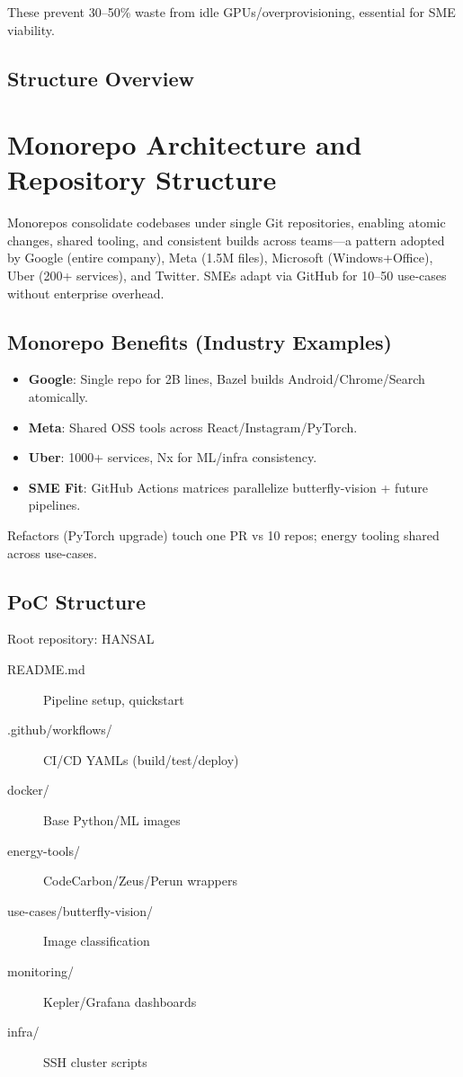 These prevent 30--50\% waste from idle GPUs/overprovisioning, essential for SME viability.

\subsection{Structure Overview}

\section{Monorepo Architecture and Repository Structure}

Monorepos consolidate codebases under single Git repositories, enabling atomic changes, shared tooling, and consistent builds across teams—a pattern adopted by Google (entire company), Meta (1.5M files), Microsoft (Windows+Office), Uber (200+ services), and Twitter. SMEs adapt via GitHub for 10--50 use-cases without enterprise overhead.

\subsection{Monorepo Benefits (Industry Examples)}

\begin{itemize}
    \item \textbf{Google}: Single repo for 2B lines, Bazel builds Android/Chrome/Search atomically.
    \item \textbf{Meta}: Shared OSS tools across React/Instagram/PyTorch.
    \item \textbf{Uber}: 1000+ services, Nx for ML/infra consistency.
    \item \textbf{SME Fit}: GitHub Actions matrices parallelize butterfly-vision + future pipelines.
\end{itemize}

Refactors (PyTorch upgrade) touch one PR vs 10 repos; energy tooling shared across use-cases.

\subsection{PoC Structure}

Root repository: HANSAL

\begin{description}
\item[README.md] Pipeline setup, quickstart
\item[.github/workflows/] CI/CD YAMLs (build/test/deploy)
\item[docker/] Base Python/ML images
\item[energy-tools/] CodeCarbon/Zeus/Perun wrappers
\item[use-cases/butterfly-vision/] Image classification
\item[monitoring/] Kepler/Grafana dashboards
\item[infra/] SSH cluster scripts
\end{description}

